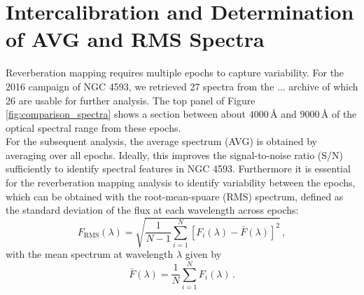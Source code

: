 \newpage


\section{Intercalibration and Determination of AVG and RMS Spectra}

Reverberation mapping requires multiple epochs to capture variability. For the 2016 campaign of NGC 4593, we retrieved 27 spectra from the ... archive of which 26 are usable for further analysis. The top panel of Figure \ref{fig:comparison_spectra} shows a section between about $4000\,\text{\AA}$ and $9000\,\text{\AA}$ of the optical spectral range from these epochs.\\
For the subsequent analysis, the average spectrum (AVG) is obtained by averaging over all epochs. Ideally, this improves the signal-to-noise ratio (S/N) sufficiently to identify spectral features in NGC 4593.  Furthermore it is essential for the reverberation mapping analysis to identify variability between the epochs, which can be obtained with the root-mean-spuare (RMS) spectrum, defined as the standard deviation of the flux at each wavelength across epochs:
\begin{equation}
	F_{\mathrm{RMS}}(\lambda) = \sqrt{\frac{1}{N-1}\sum_{i=1}^{N}\left[F_i(\lambda)-\bar{F}(\lambda)\right]^2}\,,
\end{equation}
with the mean spectrum at wavelength $\lambda$ given by
\begin{equation}
	\bar{F}(\lambda) = \frac{1}{N}\sum_{i=1}^{N} F_i(\lambda)\,.
\end{equation}

